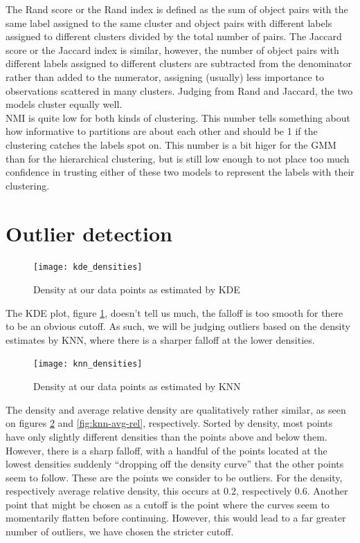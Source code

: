 The Rand score or the Rand index is defined as the sum of object pairs with
the same label assigned to the same cluster and object pairs with different
labels assigned to different clusters divided by the total number of pairs. The
Jaccard score or the Jaccard index is similar, however, the number of object
pairs with different labels assigned to different clusters are subtracted from
the denominator rather than added to the numerator, assigning (usually) less
importance to observations scattered in many clusters. Judging from Rand and
Jaccard, the two models cluster equally well.\\
NMI is quite low for both kinds of clustering. This number tells something about
how informative to partitions are about each other and should be 1 if the clustering
catches the labels spot on. This number is a bit higer for the GMM than for the hierarchical
clustering, but is still low enough to not place too much confidence in trusting either
of these two models to represent the labels with their clustering.

\section{Outlier detection}
\begin{figure}[htbp]
  \centering
  \texttt{[image: kde\_densities]}
  \caption{Density at our data points as estimated by KDE}
  \label{fig:kde}
\end{figure}

The KDE plot, figure \ref{fig:kde},
doesn't tell us much,
the falloff is too smooth
for there to be an obvious cutoff.
As such,
we will be judging outliers based on the
density estimates by KNN,
where there is a sharper falloff at the lower densities.

\begin{figure}[htbp]
  \centering
  \texttt{[image: knn\_densities]}
  \caption{Density at our data points as estimated by KNN}
  \label{fig:knn}
\end{figure}

The density and average relative density are qualitatively rather similar,
as seen on figures \ref{fig:knn} and \ref{fig:knn-avg-rel}, respectively.
Sorted by density,
most points have only slightly different densities than the points
above and below them.
However, there is a sharp falloff,
with a handful of the points located at the lowest densities
suddenly ``dropping off the density curve''
that the other points seem to follow.
These are the points we consider to be outliers.
For the density, respectively average relative density,
this occurs at $0.2$, respectively $0.6$.
Another point that might be chosen as a cutoff is
the point where the curves seem to momentarily flatten before continuing.
However, this would lead to a far greater number of outliers,
we have chosen the stricter cutoff.

